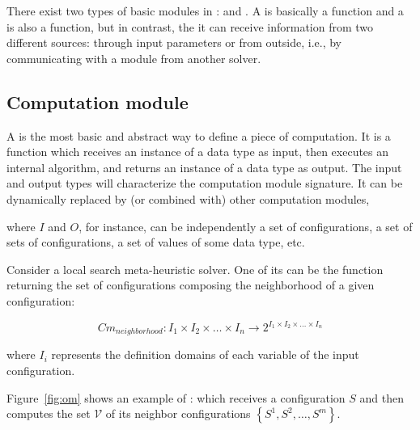 There exist two types of basic modules in \posl: \oms{} and \opchs{}. A \om{} is basically a function and a \opch{} is also a function, but in contrast, the it can receive information from two different sources: through input parameters or from outside, i.e., by communicating with a module from another solver.

\subsection{Computation module}


A \om{} is the most basic and abstract way to define a piece of computation. It is a function which receives an instance of a \posl{} data type as input, then executes an internal algorithm, and returns an instance of a \posl{} data type as output. The input and output types will characterize the computation module signature. It can be dy\-na\-mi\-cally replaced by (or combined with) other computation modules, 


where $I$ and $O$, for instance, can be independently a set of configurations, a set of sets of configurations, a set of values of some data type, etc.

Consider a local search meta-heuristic solver. One of its \oms{} can be the function returning the set of configurations composing the neighborhood of a given configuration:

\begin{equation*}
Cm_{neighborhood}:I_1\times I_2\times\dots\times I_n \rightarrow 2^{I_1\times I_2\times\dots\times I_n}
\end{equation*}

\noindent where $I_i$ represents the definition domains of each variable of the input confi\-gura\-tion.

Figure~\ref{fig:om} shows an example of \om: which receives a configuration $S$ and then computes the set $\mathcal{V}$ of its neighbor configurations $\left\{S^1, S^2, \dots, S^m\right\}$.

